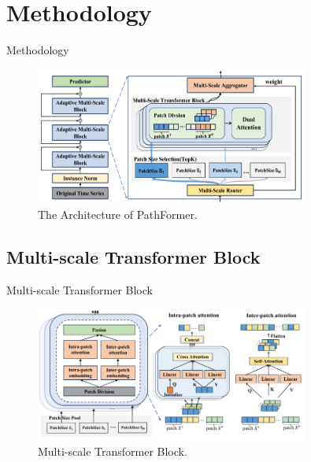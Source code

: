 \documentclass[12pt,aspectratio=169]{beamer}
\begin{document}
\section{Methodology}

\begin{frame}{Methodology}

  \begin{figure}

    \centering
    \includegraphics[width=0.8\textwidth]{fig/framework.png}
    \caption{The Architecture of PathFormer.}

  \end{figure}

\end{frame}

\subsection{Multi-scale Transformer Block}

\begin{frame}{Multi-scale Transformer Block}

  \begin{figure}

    \centering
    \includegraphics[width=0.8\textwidth]{fig/multi-scale transformer block.png}
    \caption{Multi-scale Transformer Block.}

  \end{figure}

\end{frame}
\end{document}
